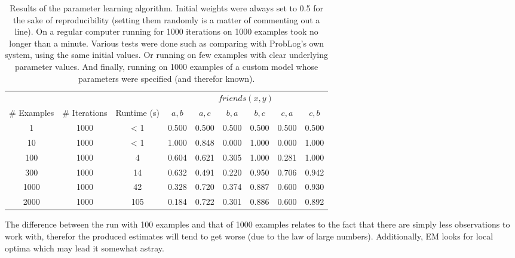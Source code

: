 \begin{table}[h]
\centering
\begin{tabular}{ccc|cccccc}
& & & \multicolumn{6}{c}{$friends(x,y)$}\\
\# Examples & \# Iterations & Runtime (s) & $a,b$ & $a,c$ & $b,a$ & $b,c$ & $c,a$ & $c,b$\\\hline
1 & 1000 & < 1 & 0.500 & 0.500 & 0.500 & 0.500 & 0.500 & 0.500 \\
10 & 1000 & < 1 & 1.000 & 0.848 & 0.000 & 1.000 & 0.000 & 1.000 \\
100 & 1000 & 4 & 0.604 & 0.621 & 0.305 & 1.000 & 0.281 & 1.000 \\
300 & 1000 & 14 & 0.632 & 0.491 & 0.220 & 0.950 & 0.706 & 0.942 \\
1000 & 1000 & 42 & 0.328 & 0.720 & 0.374 & 0.887 & 0.600 & 0.930 \\
2000 & 1000 & 105 & 0.184 & 0.722 & 0.301 & 0.886 & 0.600 & 0.892 \\
\end{tabular}
\caption{Results of the parameter learning algorithm. Initial weights were always set to 0.5 for the sake of reproducibility (setting them randomly is a matter of commenting out a line). On a regular computer running for 1000 iterations on 1000 examples took no longer than a minute. Various tests were done such as comparing with ProbLog's own system, using the same initial values. Or running on few examples with clear underlying parameter values. And finally, running on 1000 examples of a custom model whose parameters were specified (and therefor known).}
\label{plres}
\end{table}

\noindent The difference between the run with 100 examples and that of 1000 examples relates to the fact that there are simply less observations to work with, therefor the produced estimates will tend to get worse (due to the law of large numbers). Additionally, EM looks for local optima which may lead it somewhat astray.